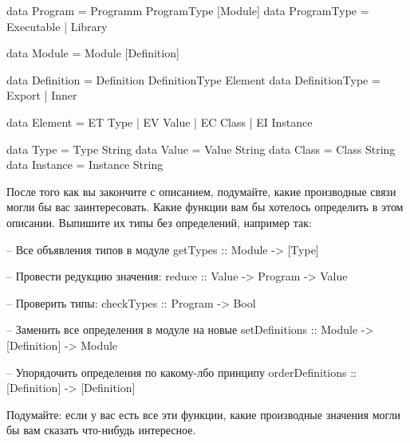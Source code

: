 \begin{code}
data Program = Programm ProgramType [Module]
data ProgramType = Executable | Library

data Module = Module [Definition]

data Definition = Definition DefinitionType Element
data DefinitionType = Export | Inner

data Element = ET Type | EV Value | EC Class | EI Instance

data Type     = Type String
data Value    = Value String
data Class    = Class String
data Instance = Instance String
\end{code}

После того как вы закончите с описанием, подумайте, какие производные
связи могли бы вас заинтересовать. Какие функции вам бы хотелось
определить в этом описании. Выпишите их типы без определений, например
так:


\begin{code}
-- Все объявления типов в модуле
getTypes :: Module -> [Type]

-- Провести редукцию значения:
reduce :: Value -> Program -> Value

-- Проверить типы:
checkTypes :: Program -> Bool

-- Заменить все определения в модуле на новые
setDefinitions    :: Module -> [Definition] -> Module

-- Упорядочить определения по какому-лбо принципу
orderDefinitions :: [Definition] -> [Definition]
\end{code}

Подумайте: если у вас есть все эти функции, какие производные значения
могли бы вам сказать что-нибудь интересное.
